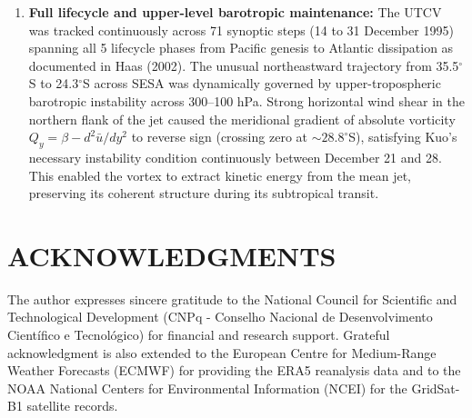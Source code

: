 \documentclass[twocolumn,a4paper,10pt]{article}
\begin{document}
\begin{enumerate}
    \item \textbf{Full lifecycle and upper-level barotropic maintenance:} The UTCV was tracked continuously across 71 synoptic steps (14 to 31 December 1995) spanning all 5 lifecycle phases from Pacific genesis to Atlantic dissipation as documented in Haas (2002). The unusual northeastward trajectory from 35.5$^\circ$S to 24.3$^\circ$S across SESA was dynamically governed by upper-tropospheric barotropic instability across 300--100 hPa. Strong horizontal wind shear in the northern flank of the jet caused the meridional gradient of absolute vorticity $Q_y = \beta - d^2\bar{u}/dy^2$ to reverse sign (crossing zero at $\sim 28.8^\circ$S), satisfying Kuo's necessary instability condition continuously between December 21 and 28. This enabled the vortex to extract kinetic energy from the mean jet, preserving its coherent structure during its subtropical transit.
\end{enumerate}

\section*{ACKNOWLEDGMENTS}
The author expresses sincere gratitude to the National Council for Scientific and Technological Development (CNPq - Conselho Nacional de Desenvolvimento Cient\'ifico e Tecnol\'ogico) for financial and research support. Grateful acknowledgment is also extended to the European Centre for Medium-Range Weather Forecasts (ECMWF) for providing the ERA5 reanalysis data and to the NOAA National Centers for Environmental Information (NCEI) for the GridSat-B1 satellite records.
\end{document}
